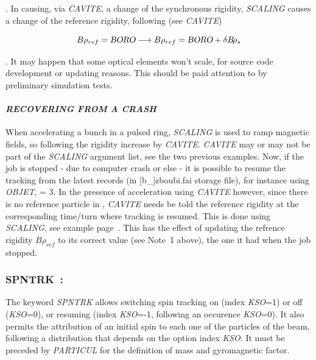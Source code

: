 {\bigskip


\medskip

. In causing, via \textsl{CAVITE}, a change of the synchronous rigidity, \textsl{SCALING} causes 
a change of the reference rigidity, following (see \textsl{CAVITE})     

$$B\rho_{ref} = \textsl{BORO} \longrightarrow B\rho_{ref} = \textsl{BORO} + \delta B\!\rho_s$$ 
 


\medskip

. It may happen that some optical elements won't scale, for source code development or updating reasons. 
This should be paid attention to by preliminary simulation tests. 


\paragraph{\textsl{RECOVERING FROM A CRASH}} \label{CrashSCALING}

\noindent When accelerating a bunch in a pulsed ring, \textsl{SCALING} is used to ramp magnetic fields, 
so following the rigidity increase by  \textsl{CAVITE}.  \textsl{CAVITE} may or may not be part of the \textsl{SCALING}
argument list, see the two previous examples. 
Now, if the job is stopped - due to computer crash or else -  it is possible to resume the tracking 
from the latest records (in [b\_]zboubi.fai storage file), for instance using \textsl{OBJET}, \KOBJ = 3.
In the presence of acceleration using \textsl{CAVITE} however,  since there is no reference particle in \zgou, 
  \textsl{CAVITE}  needs be told the reference rigidity at the corresponding time/turn where tracking is resumed. 
This is done using \textsl{SCALING}, see example page~\pageref{ExaOBJ3Recovery}. This has the effect of updating 
the refrence rigidity $B\rho_{ref}$ to its correct value (see Note~1 above), the one it had when the job stopped. 






\newpage

\subsubsection{SPNTRK~: \SPNTRKTitl} \label{SPNTRK} 
\medskip

The keyword \textsl{SPNTRK} allows switching  spin tracking on (index \textsl{KSO}=1) or off (\textsl{KSO}=0), 
or resuming (index \textsl{KSO}=-1, following an occurence \textsl{KSO}=0). 
 It also permits the attribution of an initial spin to each one of the 
\IMAX{} particles of the beam, following a distribution that depends 
on the option index \textsl{KSO}. It must be preceded by \textsl{PARTICUL} for
the definition of  mass and gyromagnetic factor.  
\medskip

}
